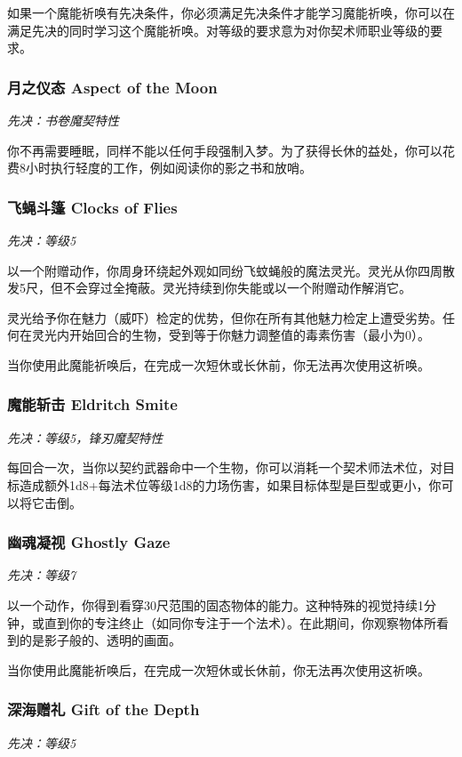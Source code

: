 如果一个魔能祈唤有先决条件，你必须满足先决条件才能学习魔能祈唤，你可以在满足先决的同时学习这个魔能祈唤。对等级的要求意为对你契术师职业等级的要求。

\subsubsection{月之仪态 Aspect of the Moon}
\emph{先决：书卷魔契特性}

你不再需要睡眠，同样不能以任何手段强制入梦。为了获得长休的益处，你可以花费8小时执行轻度的工作，例如阅读你的影之书和放哨。

\subsubsection{飞蝇斗篷 Clocks of Flies}
\emph{先决：等级5}

以一个附赠动作，你周身环绕起外观如同纷飞蚊蝇般的魔法灵光。灵光从你四周散发5尺，但不会穿过全掩蔽。灵光持续到你失能或以一个附赠动作解消它。

灵光给予你在魅力（威吓）检定的优势，但你在所有其他魅力检定上遭受劣势。任何在灵光内开始回合的生物，受到等于你魅力调整值的毒素伤害（最小为0）。

当你使用此魔能祈唤后，在完成一次短休或长休前，你无法再次使用这祈唤。

\subsubsection{魔能斩击 Eldritch Smite}
\emph{先决：等级5，锋刃魔契特性}

每回合一次，当你以契约武器命中一个生物，你可以消耗一个契术师法术位，对目标造成额外1d8+每法术位等级1d8的力场伤害，如果目标体型是巨型或更小，你可以将它击倒。

\subsubsection{幽魂凝视 Ghostly Gaze}
\emph{先决：等级7}

以一个动作，你得到看穿30尺范围的固态物体的能力。这种特殊的视觉持续1分钟，或直到你的专注终止（如同你专注于一个法术）。在此期间，你观察物体所看到的是影子般的、透明的画面。

当你使用此魔能祈唤后，在完成一次短休或长休前，你无法再次使用这祈唤。

\subsubsection{深海赠礼 Gift of the Depth}
\emph{先决：等级5}

